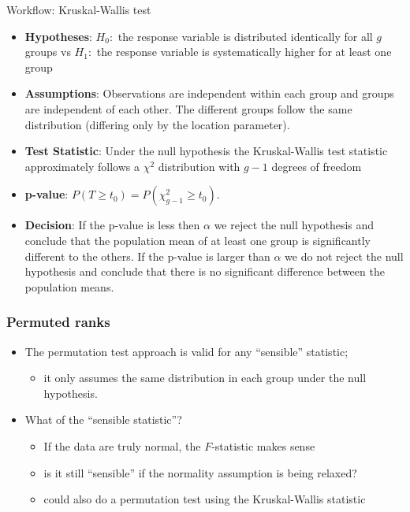 \documentclass[a4paper]{article}\usepackage[]{graphicx}\usepackage[]{xcolor}
\begin{document}
\begin{redbox}{Workflow: Kruskal-Wallis test}
	\begin{itemize}
		\item \textbf{Hypotheses}: \( H_0: \) the response variable is distributed identically for all \( g \) groups vs \( H_1: \) the response variable is systematically higher for at least one group
		\item \textbf{Assumptions}: Observations are independent within each group and groups are independent of each other. The different groups follow the same distribution (differing only by the location parameter).
		\item \textbf{Test Statistic}:  Under the null hypothesis the Kruskal-Wallis test statistic approximately follows a \( \chi^2 \) distribution with \( g - 1 \) degrees of freedom
		\item \textbf{p-value}: \( P (T \geq t_0) = P(\chi^{2}_{g-1} \geq t_0) \).
		\item \textbf{Decision}: If the p-value is less then \( \alpha \) we reject the null hypothesis and conclude that the population mean of at least one group is significantly different to the others. If the p-value is larger than \( \alpha \) we do not reject the null hypothesis and conclude that there is no significant difference between the population means.
	\end{itemize}
\end{redbox}
\subsubsection{Permuted ranks}
\begin{itemize}
	\item The permutation test approach is valid for any ``sensible'' statistic;
	\begin{itemize}
		\item it only assumes the same distribution in each group under the null hypothesis.
	\end{itemize}
	\item What of the ``sensible statistic''?
	\begin{itemize}
		\item If the data are truly normal, the \( F \)-statistic makes sense
		\item is it still ``sensible'' if the normality assumption is being relaxed?
		\item could also do a permutation test using the Kruskal-Wallis statistic
	\end{itemize}
\end{itemize}
\end{document}
